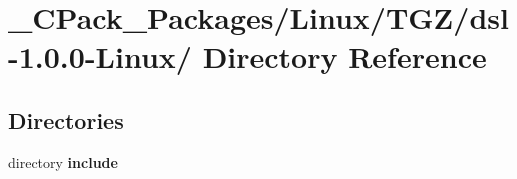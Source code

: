 \section{\_\-CPack\_\-Packages/Linux/TGZ/dsl-\/1.0.0-\/Linux/ Directory Reference}
\label{dir_a6706984b7e17595025dfc88346ee31b}
\subsection*{Directories}
\begin{DoxyCompactItemize}
\item 
directory {\bf include}
\end{DoxyCompactItemize}

